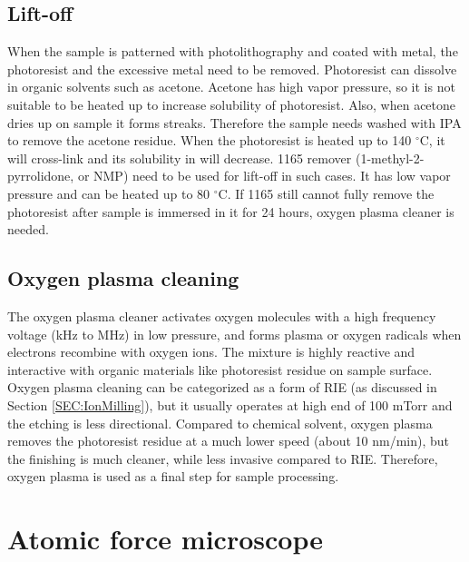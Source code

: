 \documentclass[pdflatex, sectionletters, 12pt]{pittetd}    %
\begin{document}
\subsection{Lift-off}

When the sample is patterned with photolithography and coated with metal, the photoresist and the excessive metal need to be removed. Photoresist can dissolve in organic solvents such as acetone. Acetone has high vapor pressure, so it is not suitable to be heated up to increase solubility of photoresist. Also, when acetone dries up on sample it forms streaks. Therefore the sample needs washed with IPA to remove the acetone residue. When the photoresist is heated up to 140 $^{\circ}$C, it will cross-link and its solubility in will decrease. 1165 remover (1-methyl-2-pyrrolidone, or NMP) need to be used for lift-off in such cases. It has low vapor pressure and can be heated up to 80 $^{\circ}$C. If 1165 still cannot fully remove the photoresist after sample is immersed in it for 24 hours, oxygen plasma cleaner is needed.

\subsection{Oxygen plasma cleaning}

The oxygen plasma cleaner activates oxygen molecules with a high frequency voltage (kHz to MHz) in low pressure, and forms plasma or oxygen radicals when electrons recombine with oxygen ions. The mixture is highly reactive and interactive with organic materials like photoresist residue on sample surface. Oxygen plasma cleaning can be categorized as a form of RIE (as discussed in Section \ref{SEC:IonMilling}), but it usually operates at high end of 100 mTorr and the etching is less directional. Compared to chemical solvent, oxygen plasma removes the photoresist residue at a much lower speed (about 10 nm/min), but the finishing is much cleaner, while less invasive compared to RIE. Therefore, oxygen plasma is used as a final step for sample processing.


\section{Atomic force microscope}
\label{SEC:AFM}
\end{document}
